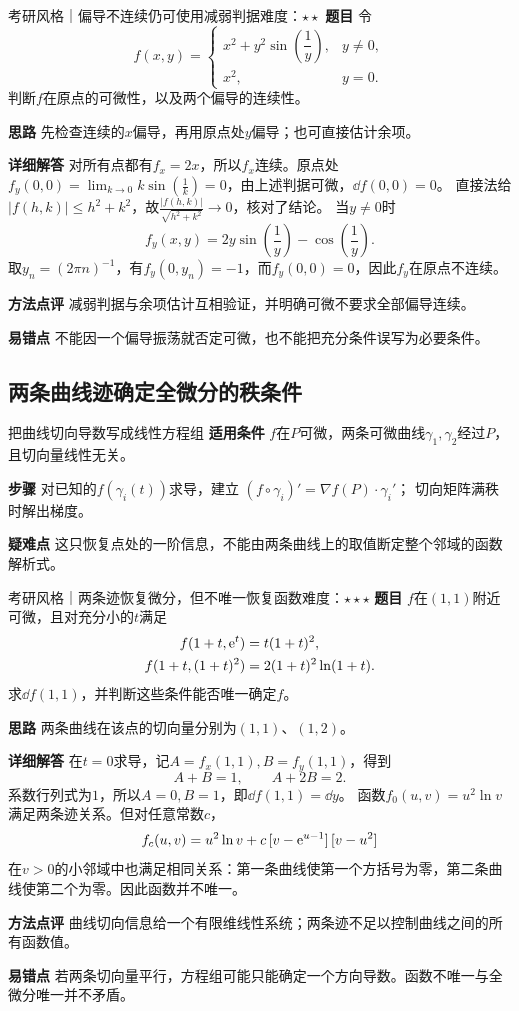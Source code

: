 \begin{example}{考研风格｜偏导不连续仍可使用减弱判据}{难度：$\star\star$}
\label{cmv:ex:onepartial}
\textbf{题目} 令
\[
f(x,y)=
\begin{cases}
x^2+y^2\sin(\dfrac{1}{y}),&y\ne0,\\
x^2,&y=0.
\end{cases}
\]
判断$f$在原点的可微性，以及两个偏导的连续性。\par
\textbf{思路} 先检查连续的$x$偏导，再用原点处$y$偏导；也可直接估计余项。\par
\textbf{详细解答} 对所有点都有$f_x=2x$，所以$f_x$连续。原点处
$f_y(0,0)=\lim_{k\to0}k\sin(\frac{1}{k})=0$，由上述判据可微，$\dd f(0,0)=0$。
直接法给$|f(h,k)|\le h^2+k^2$，故$\frac{|f(h,k)|}{\sqrt{h^2+k^2}}\to0$，核对了结论。
当$y\ne0$时
\[
f_y(x,y)=2y\sin(\dfrac{1}{y})-\cos(\dfrac{1}{y}).
\]
取$y_n=(2\pi n)^{-1}$，有$f_y(0,y_n)=-1$，而$f_y(0,0)=0$，因此$f_y$在原点不连续。\par
\textbf{方法点评} 减弱判据与余项估计互相验证，并明确可微不要求全部偏导连续。\par
\textbf{易错点} 不能因一个偏导振荡就否定可微，也不能把充分条件误写为必要条件。
\end{example}

\subsection{两条曲线迹确定全微分的秩条件}\label{cmv:traces}
\begin{method}{把曲线切向导数写成线性方程组}
\textbf{适用条件} $f$在$P$可微，两条可微曲线$\gamma_1,\gamma_2$经过$P$，且切向量线性无关。\par
\textbf{步骤} 对已知的$f(\gamma_i(t))$求导，建立
$(f\circ\gamma_i)'=\nabla f(P)\cdot\gamma_i'$；
切向矩阵满秩时解出梯度。\par
\textbf{疑难点} 这只恢复点处的一阶信息，不能由两条曲线上的取值断定整个邻域的函数解析式。
\end{method}
\begin{example}{考研风格｜两条迹恢复微分，但不唯一恢复函数}{难度：$\star\star\star$}
\label{cmv:ex:traces}
\textbf{题目} $f$在$(1,1)$附近可微，且对充分小的$t$满足
\[
\begin{aligned}
f(1+t,\mathrm{e}^t)&=t(1+t)^2,\\
f(1+t,(1+t)^2)&=2(1+t)^2\ln(1+t).
\end{aligned}
\]
求$\dd f(1,1)$，并判断这些条件能否唯一确定$f$。\par
\textbf{思路} 两条曲线在该点的切向量分别为$(1,1)$、$(1,2)$。\par
\textbf{详细解答} 在$t=0$求导，记$A=f_x(1,1),B=f_y(1,1)$，得到
\[
A+B=1,\qquad A+2B=2.
\]
系数行列式为$1$，所以$A=0,B=1$，即$\dd f(1,1)=\dd y$。
函数$f_0(u,v)=u^2\ln v$满足两条迹关系。但对任意常数$c$，
\[
f_c(u,v)=u^2\ln v+
c\,[v-\mathrm{e}^{u-1}]\,[v-u^2]
\]
在$v>0$的小邻域中也满足相同关系：第一条曲线使第一个方括号为零，第二条曲线使第二个为零。因此函数并不唯一。\par
\textbf{方法点评} 曲线切向信息给一个有限维线性系统；两条迹不足以控制曲线之间的所有函数值。\par
\textbf{易错点} 若两条切向量平行，方程组可能只能确定一个方向导数。函数不唯一与全微分唯一并不矛盾。
\end{example}

